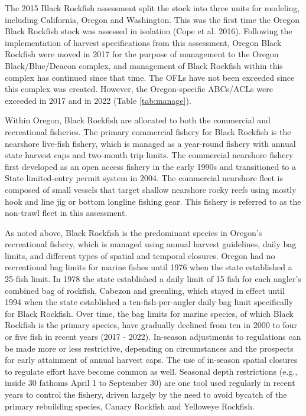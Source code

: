 \documentclass[11pt,
  english,
  letterpaper,
]{article}
\begin{document}
The 2015 Black Rockfish assessment split the stock into three units for modeling, including California, Oregon and Washington. This was the first time the Oregon Black Rockfish stock was assessed in isolation (Cope et al. 2016). Following the implementation of harvest specifications from this assessment, Oregon Black Rockfish were moved in 2017 for the purpose of management to the Oregon Black/Blue/Deacon complex, and management of Black Rockfish within this complex has continued since that time. The OFLs have not been exceeded since this complex was created. However, the Oregon-specific ABCs/ACLs were exceeded in 2017 and in 2022 (Table \ref{tab:manage}).

Within Oregon, Black Rockfish are allocated to both the commercial and recreational fisheries. The primary commercial fishery for Black Rockfish is the nearshore live-fish fishery, which is managed as a year-round fishery with annual state harvest caps and two-month trip limits. The commercial nearshore fishery first developed as an open access fishery in the early 1990s and transitioned to a State limited-entry permit system in 2004. The commercial nearshore fleet is composed of small vessels that target shallow nearshore rocky reefs using mostly hook and line jig or bottom longline fishing gear. This fishery is referred to as the non-trawl fleet in this assessment.

As noted above, Black Rockfish is the predominant species in Oregon's recreational fishery, which is managed using annual harvest guidelines, daily bag limits, and different types of spatial and temporal closures. Oregon had no recreational bag limits for marine fishes until 1976 when the state established a 25-fish limit. In 1978 the state established a daily limit of 15 fish for each angler's combined bag of rockfish, Cabezon and greenling, which stayed in effect until 1994 when the state established a ten-fish-per-angler daily bag limit specifically for Black Rockfish. Over time, the bag limits for marine species, of which Black Rockfish is the primary species, have gradually declined from ten in 2000 to four or five fish in recent years (2017 - 2022). In-season adjustments to regulations can be made more or less restrictive, depending on circumstances and the prospects for early attainment of annual harvest caps. The use of in-season spatial closures to regulate effort have become common as well. Seasonal depth restrictions (e.g., inside 30 fathoms April 1 to September 30) are one tool used regularly in recent years to control the fishery, driven largely by the need to avoid bycatch of the primary rebuilding species, Canary Rockfish and Yelloweye Rockfish.
\end{document}
